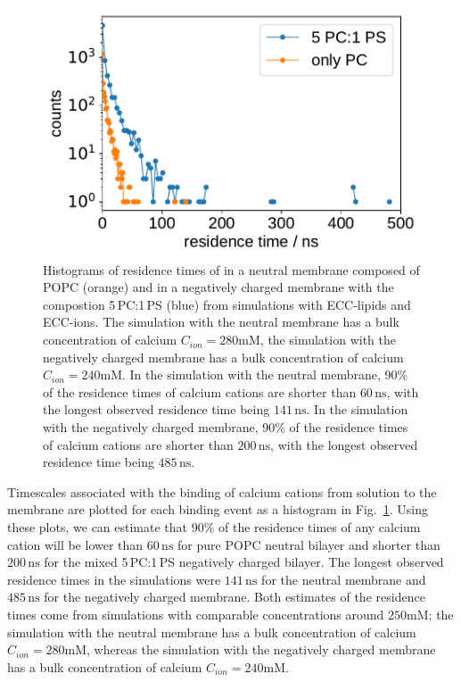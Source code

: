 \begin{figure}[tb!]
  \centering
  \includegraphics[width=\figwidth]{../img/histogram_bound_times_26CaCl2_comparison_PC-PCPS.pdf}
  \caption{\label{fig:hist_residence_times}
   Histograms of residence times of  
   in a neutral membrane composed of POPC (orange)
   and in a negatively charged membrane with the compostion 5\,PC:1\,PS (blue)
   from simulations with ECC-lipids and ECC-ions.
   The simulation with the neutral membrane has a bulk concentration of calcium $C_{ion} = 280\mathrm{mM}$, 
   the simulation with the negatively charged membrane has a bulk concentration of calcium $C_{ion} = 240\mathrm{mM}$. 
   In the simulation with the neutral membrane, 
   90\% of the residence times of calcium cations are
   shorter than $60\,\mathrm{ns}$, %
   with the longest observed residence time being $141\,\mathrm{ns}$. 
   In the simulation with the negatively charged membrane, 
   90\% of the residence times of calcium cations are
   shorter than $200\,\mathrm{ns}$, %
   with the longest observed residence time being $485\,\mathrm{ns}$. 
   }
\end{figure}


Timescales associated with the binding of calcium cations from solution to the membrane
are plotted for each binding event as a histogram in Fig.~\ref{fig:hist_residence_times}. 
Using these plots, we can estimate that 90\% of the residence times of any calcium cation 
will be lower than $60\,\mathrm{ns}$ for pure POPC neutral bilayer 
and shorter than $200\,\mathrm{ns}$ for the mixed 5\,PC:1\,PS negatively charged bilayer. 
The longest observed residence times in the simulations were $141\,\mathrm{ns}$ for the neutral membrane 
and $485\,\mathrm{ns}$ for the negatively charged membrane. 
Both estimates of the residence times come from simulations with comparable concentrations around $250\mathrm{mM}$;
the simulation with the neutral membrane has a bulk concentration of calcium $C_{ion} = 280\mathrm{mM}$, 
whereas the simulation with the negatively charged membrane has a bulk concentration of calcium $C_{ion} = 240\mathrm{mM}$. 

